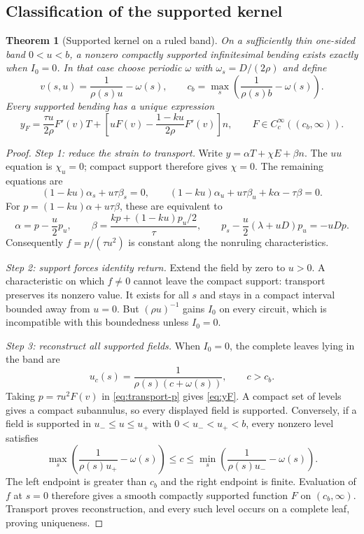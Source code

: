 \documentclass[11pt]{amsart}
\newtheorem{theorem}{Theorem}[section]
\theoremstyle{definition}
\theoremstyle{remark}
\numberwithin{equation}{section}
\begin{document}
\subsection{Classification of the supported kernel}
\begin{theorem}[Supported kernel on a ruled band]\label{thm:ruled}
On a sufficiently thin one-sided band $0<u<b$, a nonzero compactly
supported infinitesimal bending exists exactly when $I_0=0$. In that
case choose periodic $\omega$ with $\omega_s=D/(2\rho)$ and define
\[
 v(s,u)=\frac1{\rho(s)u}-\omega(s),\qquad
 c_b=\max_s\left(\frac1{\rho(s)b}-\omega(s)\right).
\]
Every supported bending has a unique expression
\begin{equation}\label{eq:yF}
 y_F=\frac{\tau u}{2\rho}F'(v)T+
 \left[uF(v)-\frac{1-ku}{2\rho}F'(v)\right]n,
 \qquad F\in C_c^\infty((c_b,\infty)).
\end{equation}
\end{theorem}
\begin{proof}
\emph{Step 1: reduce the strain to transport.}
Write $y=\alpha T+\chi E+\beta n$. The $uu$ equation is $\chi_u=0$;
compact support therefore gives $\chi=0$. The remaining equations are
\[
 (1-ku)\alpha_s+u\tau\beta_s=0,\qquad
 (1-ku)\alpha_u+u\tau\beta_u+k\alpha-\tau\beta=0.
\]
For $p=(1-ku)\alpha+u\tau\beta$, these are equivalent to
\begin{equation}\label{eq:transport-p}
 \alpha=p-\frac u2p_u,\qquad
 \beta=\frac{kp+(1-ku)p_u/2}{\tau},\qquad
 p_s-\frac u2(\lambda+uD)p_u=-uDp.
\end{equation}
Consequently $f=p/(\tau u^2)$ is constant along the nonruling
characteristics.

\emph{Step 2: support forces identity return.}
Extend the field by zero to $u>0$. A characteristic on which $f\ne0$
cannot leave the compact support: transport preserves its nonzero value.
It exists for all $s$ and stays in a compact interval bounded away from
$u=0$. But $(\rho u)^{-1}$ gains $I_0$ on every circuit, which is
incompatible with this boundedness unless $I_0=0$.

\emph{Step 3: reconstruct all supported fields.}
When $I_0=0$, the complete leaves lying in the band are
\begin{equation}\label{eq:closed-leaves}
 u_c(s)=\frac1{\rho(s)(c+\omega(s))},\qquad c>c_b.
\end{equation}
Taking $p=\tau u^2F(v)$ in \eqref{eq:transport-p} gives \eqref{eq:yF}.
A compact set of levels gives a compact subannulus, so every displayed
field is supported. Conversely, if a field is supported in
$u_-\le u\le u_+$ with $0<u_-<u_+<b$, every nonzero level satisfies
\[
 \max_s\left(\frac1{\rho(s)u_+}-\omega(s)\right)
 \le c\le
 \min_s\left(\frac1{\rho(s)u_-}-\omega(s)\right).
\]
The left endpoint is greater than $c_b$ and the right endpoint is finite.
Evaluation of $f$ at $s=0$ therefore gives a smooth compactly supported
function $F$ on $(c_b,\infty)$. Transport proves reconstruction, and every
such level occurs on a complete leaf, proving uniqueness.
\end{proof}
\end{document}
